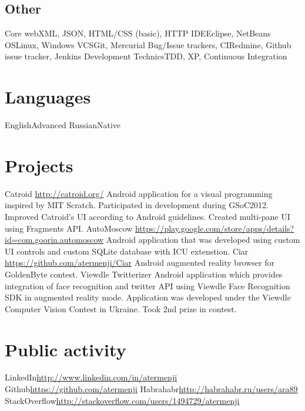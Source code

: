 \documentclass[11pt,a4paper]{moderncv}
\begin{document}
\subsection{Other}
\cvline
	{Core web}{XML, JSON, HTML/CSS (basic), HTTP}
\cvline
	{IDE}{Eclipse, NetBeans}
\cvline
	{OS}{Linux, Windows}
\cvline
	{VCS}{Git, Mercurial}
\cvline
	{Bug/Issue trackers, CI}{Redmine, Github issue tracker, Jenkins}
\cvline
	{Development Technics}{TDD, XP, Continuous Integration}

\section{Languages}
\cvitemwithcomment
	{English}{Advanced}{}
\cvitemwithcomment
	{Russian}{Native}{}

\section{Projects}
\cvline
    {Catroid}
    {\url{http://catroid.org/}\newline{}
    Android application for a visual programming inspired by MIT Scratch.
    Participated in development during GSoC2012. Improved Catroid's UI according to Android guidelines. 
    Created multi-pane UI using Fragments API.}
\cvline
    {AutoMoscow}
    {\url{https://play.google.com/store/apps/details?id=com.goorin.automoscow}\newline{}
    Android application that was developed using custom UI controls and custom SQLite database with ICU extenstion.}
\cvline
    {Ciar}
    {\url{https://github.com/atermenji/Ciar}\newline{}
    Android augmented reality browser for GoldenByte contest.}
\cvline
    {Viewdle Twitterizer}
    {Android application which provides integration of face recognition and twitter API
	using Viewdle Face Recognition SDK in augmented reality mode. Application was developed under 
	the Viewdle Computer Vision Contest in Ukraine. Took 2nd prize in contest.}

\section{Public activity}
\cvline
	{LinkedIn}{\url{http://www.linkedin.com/in/atermenji}}
\cvline
	{Github}{\url{https://github.com/atermenji}}
\cvline
	{Habrahabr}{\url{http://habrahabr.ru/users/ara89}}
\cvline
	{StackOverflow}{\url{http://stackoverflow.com/users/1494729/atermenji}}
\end{document}
